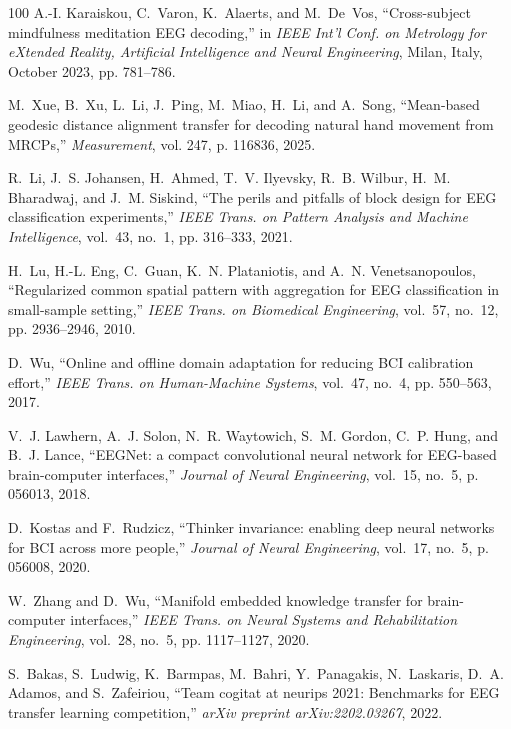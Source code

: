 \documentclass[journal]{IEEEtran}
\begin{document}
\begin{thebibliography}{100}
A.-I. Karaiskou, C.~Varon, K.~Alaerts, and M.~De~Vos, ``Cross-subject
  mindfulness meditation {EEG} decoding,'' in \emph{IEEE Int'l Conf. on
  Metrology for eXtended Reality, Artificial Intelligence and Neural
  Engineering}, Milan, Italy, October 2023, pp. 781--786.

M.~Xue, B.~Xu, L.~Li, J.~Ping, M.~Miao, H.~Li, and A.~Song, ``Mean-based
  geodesic distance alignment transfer for decoding natural hand movement from
  {MRCPs},'' \emph{Measurement}, vol. 247, p. 116836, 2025.

R.~Li, J.~S. Johansen, H.~Ahmed, T.~V. Ilyevsky, R.~B. Wilbur, H.~M. Bharadwaj,
  and J.~M. Siskind, ``The perils and pitfalls of block design for {EEG}
  classification experiments,'' \emph{IEEE Trans. on Pattern Analysis and
  Machine Intelligence}, vol.~43, no.~1, pp. 316--333, 2021.

H.~Lu, H.-L. Eng, C.~Guan, K.~N. Plataniotis, and A.~N. Venetsanopoulos,
  ``Regularized common spatial pattern with aggregation for {EEG}
  classification in small-sample setting,'' \emph{IEEE Trans. on Biomedical
  Engineering}, vol.~57, no.~12, pp. 2936--2946, 2010.

D.~Wu, ``Online and offline domain adaptation for reducing {BCI} calibration
  effort,'' \emph{IEEE Trans. on Human-Machine Systems}, vol.~47, no.~4, pp.
  550--563, 2017.

V.~J. Lawhern, A.~J. Solon, N.~R. Waytowich, S.~M. Gordon, C.~P. Hung, and
  B.~J. Lance, ``{EEGNet}: a compact convolutional neural network for
  {EEG}-based brain-computer interfaces,'' \emph{Journal of Neural
  Engineering}, vol.~15, no.~5, p. 056013, 2018.

D.~Kostas and F.~Rudzicz, ``Thinker invariance: enabling deep neural networks
  for {BCI} across more people,'' \emph{Journal of Neural Engineering},
  vol.~17, no.~5, p. 056008, 2020.

W.~Zhang and D.~Wu, ``Manifold embedded knowledge transfer for brain-computer
  interfaces,'' \emph{IEEE Trans. on Neural Systems and Rehabilitation
  Engineering}, vol.~28, no.~5, pp. 1117--1127, 2020.

S.~Bakas, S.~Ludwig, K.~Barmpas, M.~Bahri, Y.~Panagakis, N.~Laskaris, D.~A.
  Adamos, and S.~Zafeiriou, ``Team cogitat at neurips 2021: Benchmarks for
  {EEG} transfer learning competition,'' \emph{arXiv preprint
  arXiv:2202.03267}, 2022.


\end{thebibliography}
\end{document}
